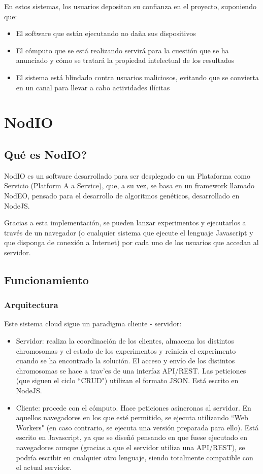 \documentclass[runningheads,a4paper]{llncs}
\begin{document}
En estos sistemas, los usuarios depositan su confianza en el proyecto, suponiendo que:
\begin{itemize}
  \item El software que est\'an ejecutando no da\~na sus dispositivos
  \item El c\'omputo que se est\'a realizando servir\'a para la cuesti\'on que se
  ha anunciado y c\'omo se tratar\'a la propiedad intelectual de los resultados
  \item El sistema est\'a blindado contra usuarios maliciosos, evitando que
  se convierta en un canal para llevar a cabo actividades il\'icitas
\end{itemize}

\section{NodIO}
\subsection{\textquestiondown	Qu\'e es NodIO?}
NodIO \cite{nodio} es un software desarrollado para ser desplegado en un
Plataforma como Servicio (Platform A a Service), que, a su vez, se basa en un
framework llamado NodEO, pensado para el desarrollo de algoritmos gen\'eticos,
desarrollado en NodeJS.

Gracias a esta implementaci\'on, se pueden lanzar experimentos y ejecutarlos a
trav\'es de un navegador (o cualquier sistema que ejecute el lenguaje Javascript
y que disponga de conexi\'on a Internet)
por cada uno de los usuarios que accedan al servidor.


\subsection{Funcionamiento}
\subsubsection{Arquitectura}
Este sistema cloud sigue un paradigma cliente - servidor:
\begin{itemize}
  \item Servidor: realiza la coordinaci\'on de los clientes, almacena los distintos chromosomas y
  el estado de los experimentos y reinicia el experimento cuando se ha encontrado la soluci\'on.
  El acceso y env\'io de los distintos chromosomas se hace a trav'es de una interfaz API/REST.
  Las peticiones (que siguen el ciclo ``CRUD") utilizan el formato JSON. Est\'a escrito en NodeJS.
  \item Cliente: procede con el c\'omputo. Hace peticiones as\'incronas al servidor.
  En aquellos navegadores en los que est\'e permitido, se ejecuta utilizando ``Web Workers"
  (en caso contrario, se ejecuta una versi\'on preparada para ello). Est\'a escrito
  en Javascript, ya que se dise\~n\'o pensando en que fuese ejecutado en navegadores aunque
  (gracias a que el servidor utiliza una API/REST), se podr\'ia escribir en cualquier otro
  lenguaje, siendo totalmente compatible con el actual servidor.
\end{itemize}
\end{document}
